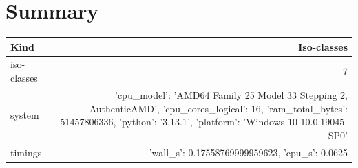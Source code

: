 \documentclass[11pt]{article}
\begin{document}
\section*{Summary}
\begin{tabular}{lr}
\toprule
Kind & Iso-classes\\\midrule
iso-classes & 7\\
system & {'cpu_model': 'AMD64 Family 25 Model 33 Stepping 2, AuthenticAMD', 'cpu_cores_logical': 16, 'ram_total_bytes': 51457806336, 'python': '3.13.1', 'platform': 'Windows-10-10.0.19045-SP0'}\\
timings & {'wall_s': 0.17558769999959623, 'cpu_s': 0.0625}\\
\bottomrule
\end{tabular}
\end{document}
